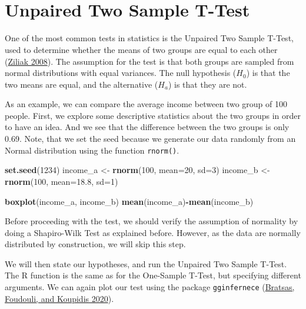 \documentclass[
]{svmono}
\newenvironment{Shaded}{\begin{snugshade}}{\end{snugshade}}
\newcommand{\AttributeTok}[1]{\textcolor[rgb]{0.13,0.29,0.53}{#1}}
\newcommand{\DecValTok}[1]{\textcolor[rgb]{0.00,0.00,0.81}{#1}}
\newcommand{\FloatTok}[1]{\textcolor[rgb]{0.00,0.00,0.81}{#1}}
\newcommand{\FunctionTok}[1]{\textcolor[rgb]{0.13,0.29,0.53}{\textbf{#1}}}
\newcommand{\NormalTok}[1]{#1}
\newcommand{\OtherTok}[1]{\textcolor[rgb]{0.56,0.35,0.01}{#1}}
\newcommand{\SpecialCharTok}[1]{\textcolor[rgb]{0.81,0.36,0.00}{\textbf{#1}}}
\begin{document}
~

~
~

\hypertarget{unpaired-two-sample-t-test}{%
\section{Unpaired Two Sample T-Test}\label{unpaired-two-sample-t-test}}

One of the most common tests in statistics is the Unpaired Two Sample
T-Test, used to determine whether the means of two groups are equal to
each other (\protect\hyperlink{ref-ziliak2008}{Ziliak 2008}). The assumption for the test is that both
groups are sampled from normal distributions with equal variances. The
null hypothesis (\(H_0\)) is that the two means are equal, and the
alternative (\(H_a\)) is that they are not.

As an example, we can compare the average income between two group of
100 people. First, we explore some descriptive statistics about the two
groups in order to have an idea. And we see that the difference between
the two groups is only 0.69. Note, that we set the seed because we
generate our data randomly from an Normal distribution using the
function \texttt{rnorm()}.

\begin{Shaded}
\begin{Highlighting}[]
\FunctionTok{set.seed}\NormalTok{(}\DecValTok{1234}\NormalTok{)}
\NormalTok{income\_a }\OtherTok{\textless{}{-}} \FunctionTok{rnorm}\NormalTok{(}\DecValTok{100}\NormalTok{, }\AttributeTok{mean=}\DecValTok{20}\NormalTok{, }\AttributeTok{sd=}\DecValTok{3}\NormalTok{)}
\NormalTok{income\_b }\OtherTok{\textless{}{-}} \FunctionTok{rnorm}\NormalTok{(}\DecValTok{100}\NormalTok{, }\AttributeTok{mean=}\FloatTok{18.8}\NormalTok{, }\AttributeTok{sd=}\DecValTok{1}\NormalTok{)}

\FunctionTok{boxplot}\NormalTok{(income\_a, income\_b)}
\FunctionTok{mean}\NormalTok{(income\_a)}\SpecialCharTok{{-}}\FunctionTok{mean}\NormalTok{(income\_b)}
\end{Highlighting}
\end{Shaded}

Before proceeding with the test, we should verify the assumption of
normality by doing a Shapiro-Wilk Test as explained before. However, as
the data are normally distributed by construction, we will skip this
step.

We will then state our hypotheses, and run the Unpaired Two Sample
T-Test. The R function is the same as for the One-Sample T-Test, but
specifying different arguments. We can again plot our test using the
package \texttt{gginfernece} (\protect\hyperlink{ref-bratsas2020}{Bratsas, Foudouli, and Koupidis 2020}).
\end{document}
